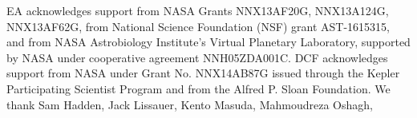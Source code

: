 \documentclass[graybox,natbib,nosecnum]{svmult}
\begin{document}
\begin{acknowledgement}
EA acknowledges support from NASA Grants NNX13AF20G, NNX13A124G, NNX13AF62G, from National Science Foundation (NSF) grant AST-1615315, and from NASA Astrobiology Institute's Virtual Planetary
Laboratory, supported by NASA under cooperative agreement NNH05ZDA001C.  DCF acknowledges support from NASA under Grant No. NNX14AB87G issued through the Kepler Participating Scientist Program and from the Alfred P. Sloan Foundation.  We thank Sam Hadden, Jack Lissauer, Kento Masuda, Mahmoudreza Oshagh, 
\end{acknowledgement}

\end{document}
